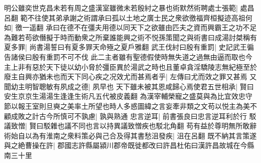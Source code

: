 明公雖奕世克昌未若有周之盛漢室雖微未若殷紂之暴也術默然術聘處士張範|{
	處昌呂翻}
範不往使其弟承謝之術謂承曰孤以土地之廣士民之衆欲徼福齊桓擬迹高祖何如|{
	徼一遥翻}
承曰在德不在彊夫用德以同天下之欲雖由匹夫之資而興霸王之功不足為難若苟欲僭擬于時而動衆之所棄誰能興之術不悦孫策聞之與術書曰成湯討桀稱有夏多罪|{
	尚書湯誓曰有夏多罪天命殛之夏戶雅翻}
武王伐紂曰殷有重罰|{
	史記武王徧告諸侯曰殷有重罰不可不伐}
此二主者雖有聖德假使時無失道之過無由逼而取也今主上非有惡於天下徒以幼小脅於彊臣異於湯武之時也且董卓貪淫驕陵志無紀極至於廢主自興亦猶未也而天下同心疾之况效尤而甚焉者乎|{
	左傳曰尤而效之罪又甚焉}
又聞幼主明智聰敏有夙成之德|{
	夙早也}
天下雖未被其恩咸歸心焉使君五世相承|{
	賢曰安生京京生湯湯生逢逢生術凡五代被皮義翻}
為漢宰輔榮寵之盛莫與為比宜效忠守節以報王室則旦奭之美率土所望也時人多惑圖緯之言妄牽非類之文苟以悦主為美不顧成敗之計古今所慎可不孰慮|{
	孰與熟通}
忠言逆耳|{
	前書張良曰忠言逆耳利於行}
駁議致憎|{
	賢曰駁雜也議不同也言以持異議致憎疾也駁北角翻}
苟有益於尊明無所敢辭術始自以為有淮南之衆料策必與己合及得其書愁沮發疾|{
	沮在呂翻}
既不納其言策遂與之絶曹操在許|{
	郡國志許縣屬潁川郡帝既徙都改曰許昌杜佑曰漢許昌故城在今縣南三十里}


